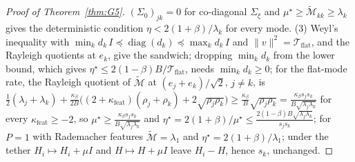 \documentclass[11pt]{article}
\theoremstyle{remark}
\begin{document}
\begin{proof}[Proof of Theorem~\ref{thm:G5}]
$(\Sigma_0)_{jk}=0$ for co-diagonal $\Sigma_\xi$ and $\mu^\star\ge\widetilde{\mathcal M}_{kk}\ge\lambda_k$ gives the deterministic condition $\eta<2(1+\beta)/\lambda_k$ for every mode. (3) Weyl's inequality with $\min_kd_k\,I\preceq\operatorname{diag}(d_k)\preceq\max_kd_k\,I$ and $\|v\|^2=\mathcal T_{\mathrm{flat}}$, and the Rayleigh quotients at $e_k$, give the sandwich; dropping $\min_kd_k$ from the lower bound, which gives $\eta^\star\le2(1-\beta)B/\mathcal T_{\mathrm{flat}}$, needs $\min_kd_k\ge0$; for the flat-mode rate, the Rayleigh quotient of $\widetilde{\mathcal M}$ at $(e_j+e_k)/\sqrt2$, $j\ne k$, is $\frac12(\lambda_j+\lambda_k)+\frac{\kappa_\beta}{2B}\big((2+\kappa_{\mathrm{feat}})(\rho_j+\rho_k)+2\sqrt{\rho_j\rho_k}\big)\ge\frac{\kappa_\beta}B\sqrt{\rho_j\rho_k}=\frac{\kappa_\beta s_js_k}{B\sqrt{\lambda_j\lambda_k}}$ for every $\kappa_{\mathrm{feat}}\ge-2$, so $\mu^\star\ge\frac{\kappa_\beta s_js_k}{B\sqrt{\lambda_j\lambda_k}}$ and $\eta^\star=2(1+\beta)/\mu^\star\le\frac{2(1-\beta)B\sqrt{\lambda_j\lambda_k}}{s_js_k}$; for $P=1$ with Rademacher features $\widetilde{\mathcal M}=\lambda_1$ and $\eta^\star=2(1+\beta)/\lambda_1$; under the tether $H_i\mapsto H_i+\mu I$ and $H\mapsto H+\mu I$ leave $H_i-H$, hence $s_k$, unchanged.
\end{proof}
\end{document}

